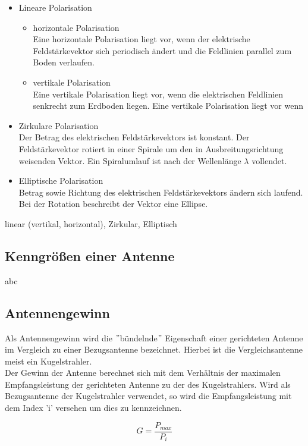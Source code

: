 \begin{itemize}
	\item Lineare Polarisation
	\begin{itemize}
		\item horizontale Polarisation\\
		Eine horizontale Polarisation liegt vor, wenn der elektrische Feldstärkevektor sich periodisch ändert und die Feldlinien parallel zum Boden verlaufen.
		\item vertikale Polarisation\\
		Eine vertikale Polarisation liegt vor, wenn die elektrischen Feldlinien senkrecht zum Erdboden liegen.
		Eine vertikale Polarisation liegt vor wenn
	\end{itemize}
	\item Zirkulare Polarisation\\
	Der Betrag des elektrischen Feldstärkevektors ist konstant. Der Feldstärkevektor rotiert in einer Spirale um den in Ausbreitungsrichtung weisenden Vektor. Ein Spiralumlauf ist nach der Wellenlänge $\lambda$ vollendet.
	\item Elliptische Polarisation\\
	Betrag sowie Richtung des elektrischen Feldstärkevektors ändern sich laufend. Bei der Rotation beschreibt der Vektor eine Ellipse.
\end{itemize}
linear (vertikal, horizontal), Zirkular, Elliptisch

\subsection{Kenngrößen einer Antenne}
abc

\subsection{Antennengewinn}
Als Antennengewinn wird die $"$bündelnde$"$ Eigenschaft einer gerichteten Antenne im Vergleich zu einer Bezugsantenne bezeichnet. Hierbei ist die Vergleichsantenne meist ein Kugelstrahler.\\
\newline
Der Gewinn der Antenne berechnet sich mit dem Verhältnis der maximalen Empfangsleistung der gerichteten Antenne zu der des Kugelstrahlers. Wird als Bezugsantenne der Kugelstrahler verwendet, so wird die Empfangsleistung mit dem Index 'i' versehen um dies zu kennzeichnen.

\begin{equation}
	G=\frac{P_{max}}{P_{i}}
\end{equation}

